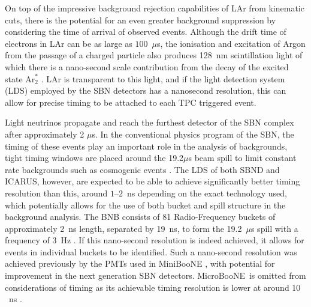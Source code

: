 \documentclass[11pt, a4paper]{article}
\def\muboone{MicroBooNE}
\begin{document}
On top of the impressive background rejection capabilities of LAr from
kinematic cuts, there is the potential for an even greater background 
suppression by considering the time of arrival of observed events. Although the 
drift time of electrons in LAr can be as large as $100$~$\mu$s, the ionisation
and excitation of Argon from the passage of a charged particle also produces
128~nm scintillation light of which there is a nano-second scale contribution
from the decay of the excited state $\text{Ar}^*_2$ \cite{Acciarri:2015hha}. LAr is
transparent to this light, and if the light detection system (LDS) employed by
the SBN detectors has a nanosecond resolution, this can allow for
precise timing to be attached to each TPC triggered event.

Light neutrinos propagate and reach the furthest detector of the SBN complex
after approximately 2 $\mu$s. In the conventional physics program of the SBN,
the timing of these events play an important role in the analysis of
backgrounds, tight timing windows are placed around the 19.2$\mu$s beam spill
to limit constant rate backgrounds such as cosmogenic events
\cite{Antonello:2015lea}. The LDS of both SBND and ICARUS, however, are
expected to be able to achieve significantly better timing resolution than
this, around $1$--$2$~ns depending on the exact technology used, which
potentially allows for the use of both bucket and spill structure in the
background analysis. The BNB consists of 81 Radio-Frequency buckets of
approximately 2~ns length, separated by 19~ns, to form the 19.2~$\mu$s spill
with a frequency of 3~Hz \cite{Antonello:2015lea}.  If this nano-second
resolution is indeed achieved, it allows for events in individual buckets to be
identified.  Such a nano-second resolution was achieved previously by the PMTs
used in MiniBooNE \cite{Antonello:2015lea}, with potential for improvement in
the next generation SBN detectors. \muboone\ is omitted from considerations of
timing as its achievable timing resolution is lower at around $10$~ns
\cite{Katori:2013wqa}.
\end{document}
